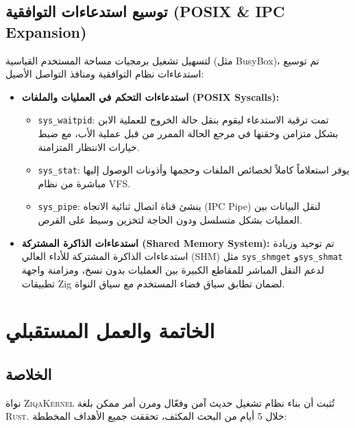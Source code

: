 \documentclass[12pt,a4paper]{article}
\theoremstyle{definition}
\newcommand{\codeinline}[1]{\texttt{\small #1}}
\newcommand{\en}[1]{\textenglish{#1}}
\begin{document}
\subsection{توسيع استدعاءات التوافقية (\en{POSIX \& IPC Expansion})}

لتسهيل تشغيل برمجيات مساحة المستخدم القياسية (مثل \en{BusyBox})، تم توسيع استدعاءات نظام التوافقية ومنافذ التواصل الأصيل:

\begin{itemize}[leftmargin=2em]
\item \textbf{استدعاءات التحكم في العمليات والملفات (\en{POSIX Syscalls}):}
  \begin{itemize}
  \item \codeinline{sys\_waitpid}: تمت ترقية الاستدعاء ليقوم بنقل حالة الخروج للعملية الابن بشكل متزامن وحقنها في مرجع الحالة الممرر من قبل عملية الأب، مع ضبط خيارات الانتظار المتزامنة.
  \item \codeinline{sys\_stat}: يوفر استعلاماً كاملاً لخصائص الملفات وحجمها وأذونات الوصول إليها مباشرة من نظام VFS.
  \item \codeinline{sys\_pipe}: ينشئ قناة اتصال ثنائية الاتجاه (\en{IPC Pipe}) لنقل البيانات بين العمليات بشكل متسلسل ودون الحاجة لتخزين وسيط على القرص.
  \end{itemize}
\item \textbf{استدعاءات الذاكرة المشتركة (\en{Shared Memory System}):}
تم توحيد وزيادة استدعاءات الذاكرة المشتركة للأداء العالي (SHM) مثل \codeinline{sys\_shmget} و\codeinline{sys\_shmat} لدعم النقل المباشر للمقاطع الكبيرة بين العمليات بدون نسخ، ومزامنة واجهة تطبيقات Zig لضمان تطابق سياق فضاء المستخدم مع سياق النواة.
\end{itemize}

\newpage

\section{الخاتمة والعمل المستقبلي}\label{sec:conc}

\subsection{الخلاصة}

نواة \textsc{ZiqaKernel} تُثبت أن بناء نظام تشغيل حديث آمن وفعّال ومرن أمر ممكن بلغة \textsc{Rust}. خلال 5 أيام من البحث المكثف، تحققت جميع الأهداف المخططة:
\end{document}
